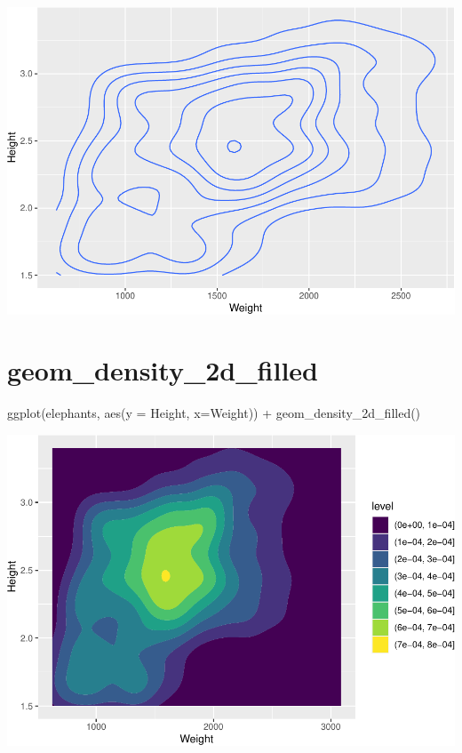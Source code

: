 \documentclass[
]{book}
\newenvironment{Shaded}{\begin{snugshade}}{\end{snugshade}}
\newcommand{\AttributeTok}[1]{\textcolor[rgb]{0.77,0.63,0.00}{#1}}
\newcommand{\FunctionTok}[1]{\textcolor[rgb]{0.00,0.00,0.00}{#1}}
\newcommand{\NormalTok}[1]{#1}
\newcommand{\SpecialCharTok}[1]{\textcolor[rgb]{0.00,0.00,0.00}{#1}}
\begin{document}
\includegraphics{Data-Visualisation-geom-Encyclopedia_files/figure-latex/unnamed-chunk-32-1.pdf}

\hypertarget{geom_density_2d_filled}{%
\section{geom\_density\_2d\_filled}\label{geom_density_2d_filled}}

\begin{Shaded}
\begin{Highlighting}[]
\FunctionTok{ggplot}\NormalTok{(elephants, }\FunctionTok{aes}\NormalTok{(}\AttributeTok{y =}\NormalTok{ Height, }\AttributeTok{x=}\NormalTok{Weight)) }\SpecialCharTok{+} 
  \FunctionTok{geom\_density\_2d\_filled}\NormalTok{()}
\end{Highlighting}
\end{Shaded}

\includegraphics{Data-Visualisation-geom-Encyclopedia_files/figure-latex/unnamed-chunk-33-1.pdf}
\end{document}
